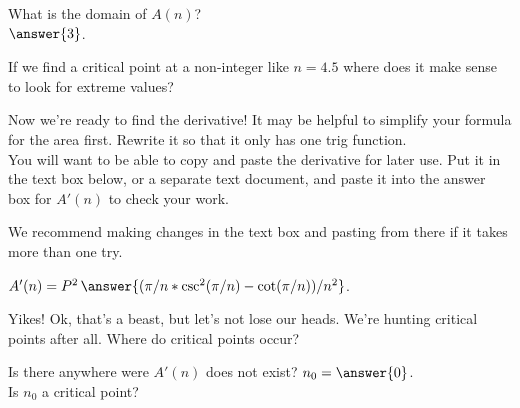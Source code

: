 \documentclass[handout,nooutcomes]{ximera}
\begin{document}
\hspace{2cm}What is the domain of $A(n)$? \\
  $\answer{3}$.\\
\begin{freeResponse}
If we find a critical point at a non-integer like $n = 4.5$ where does it make sense to look for extreme values?
\end{freeResponse}

\bigskip

\hspace{2cm}Now we're ready to find the derivative! It may be helpful to simplify your formula for the area first. Rewrite it so that it only has one trig function.\\
You will want to be able to copy and paste the derivative for later use. Put it in the text box below, or a separate text document, and paste it into the answer box for $A'(n)$ to check your work.\\

\begin{freeResponse}
We recommend making changes in the text box and pasting from there if it takes more than one try.
\end{freeResponse}
$A'(n) = P^2\,\answer{(\pi/n*\csc^2(\pi/n)-\cot(\pi/n))/n^2}$.\\

\bigskip

\hspace{2cm}Yikes! Ok, that's a beast, but let's not lose our heads. We're hunting critical points after all. Where do critical points occur?\\
\begin{selectAll}
\end{selectAll}
Is there anywhere were $A'(n)$ does not exist? $n_0 = \answer{0}$.\\
Is $n_0$ a critical point?\\
\begin{multipleChoice}
\end{multipleChoice}
\end{document}
